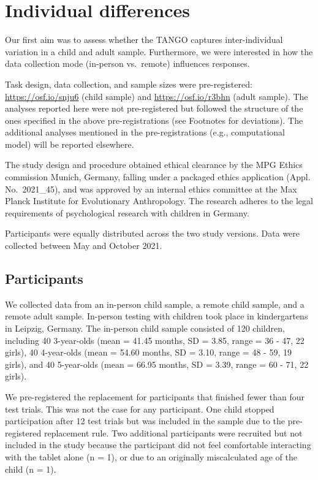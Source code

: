 \documentclass[
  man,floatsintext]{apa7}
\begin{document}
\hypertarget{individual-differences}{%
\section{Individual differences}\label{individual-differences}}

Our first aim was to assess whether the TANGO captures inter-individual variation in a child and adult sample.
Furthermore, we were interested in how the data collection mode (in-person vs.~remote) influences responses.

Task design, data collection, and sample sizes were pre-registered: \url{https://osf.io/snju6} (child sample) and \url{https://osf.io/r3bhn} (adult sample).
The analyses reported here were not pre-registered but followed the structure of the ones specified in the above pre-registrations (see Footnotes for deviations).
The additional analyses mentioned in the pre-registrations (e.g., computational model) will be reported elsewhere.

The study design and procedure obtained ethical clearance by the MPG Ethics commission Munich, Germany, falling under a packaged ethics application (Appl. No.~2021\_45), and was approved by an internal ethics committee at the Max Planck Institute for Evolutionary Anthropology.
The research adheres to the legal requirements of psychological research with children in Germany.

Participants were equally distributed across the two study versions.
Data were collected between May and October 2021.

\hypertarget{participants}{%
\subsection{Participants}\label{participants}}

We collected data from an in-person child sample, a remote child sample, and a remote adult sample.
In-person testing with children took place in kindergartens in Leipzig, Germany.
The in-person child sample consisted of 120 children, including 40 3-year-olds (mean = 41.45 months, SD = 3.85, range = 36 - 47, 22 girls), 40 4-year-olds (mean = 54.60 months, SD = 3.10, range = 48 - 59, 19 girls), and 40 5-year-olds (mean = 66.95 months, SD = 3.39, range = 60 - 71, 22 girls).

We pre-registered the replacement for participants that finished fewer than four test trials.
This was not the case for any participant.
One child stopped participation after 12 test trials but was included in the sample due to the pre-registered replacement rule.
Two additional participants were recruited but not included in the study because the participant did not feel comfortable interacting with the tablet alone (n = 1), or due to an originally miscalculated age of the child (n = 1).
\end{document}
